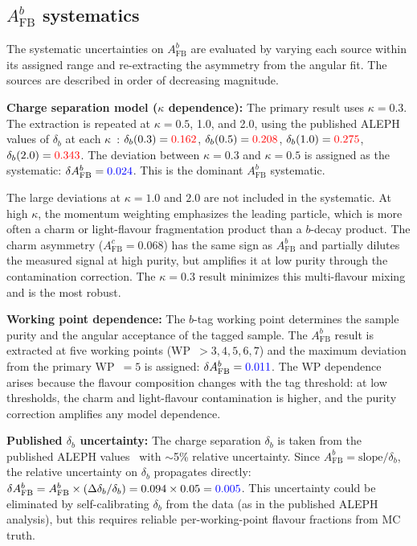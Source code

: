 \documentclass[11pt,a4paper]{article}
\newcommand{\measured}[1]{\textcolor{blue}{#1}}
\newcommand{\external}[1]{\textcolor{red}{#1}}
\begin{document}
\subsection{$A_\mathrm{FB}^b$ systematics}
\label{sec:syst-afb}

The systematic uncertainties on $A_\mathrm{FB}^b$ are evaluated by
varying each source within its assigned range and re-extracting the
asymmetry from the angular fit.  The sources are described in order
of decreasing magnitude.

\textbf{Charge separation model ($\kappa$ dependence):}
The primary result uses $\kappa = 0.3$.  The extraction is repeated
at $\kappa = 0.5$, 1.0, and 2.0, using the published ALEPH values of
$\delta_b$ at each $\kappa$~\cite{ALEPH:AFBb}: $\delta_b(0.3) =
\external{0.162}$, $\delta_b(0.5) = \external{0.208}$,
$\delta_b(1.0) = \external{0.275}$, $\delta_b(2.0) = \external{0.343}$.
The deviation between $\kappa = 0.3$ and $\kappa = 0.5$ is assigned as
the systematic: $\delta A_\mathrm{FB}^b = \measured{0.024}$.  This is
the dominant $A_\mathrm{FB}^b$ systematic.

The large deviations at $\kappa = 1.0$ and $2.0$ are not included in the
systematic.  At high $\kappa$, the momentum weighting emphasizes the
leading particle, which is more often a charm or light-flavour fragmentation
product than a $b$-decay product.  The charm asymmetry
($A_\mathrm{FB}^c = 0.068$) has the same sign as $A_\mathrm{FB}^b$
and partially dilutes the measured signal at high purity, but amplifies
it at low purity through the contamination correction.  The $\kappa = 0.3$
result minimizes this multi-flavour mixing and is the most robust.

\textbf{Working point dependence:}
The $b$-tag working point determines the sample purity and the angular
acceptance of the tagged sample.  The $A_\mathrm{FB}^b$ result is
extracted at five working points (WP~$> 3, 4, 5, 6, 7$) and the maximum
deviation from the primary WP~$= 5$ is assigned:
$\delta A_\mathrm{FB}^b = \measured{0.011}$.  The WP dependence arises
because the flavour composition changes with the tag threshold: at low
thresholds, the charm and light-flavour contamination is higher, and
the purity correction amplifies any model dependence.

\textbf{Published $\delta_b$ uncertainty:}
The charge separation $\delta_b$ is taken from the published ALEPH
values~\cite{LEP:EWWG:2005} with $\sim$5\% relative uncertainty.  Since
$A_\mathrm{FB}^b = \mathrm{slope}/\delta_b$, the relative uncertainty
on $\delta_b$ propagates directly: $\delta A_\mathrm{FB}^b =
A_\mathrm{FB}^b \times (\Delta\delta_b / \delta_b) = 0.094 \times 0.05 =
\measured{0.005}$.  This uncertainty could be eliminated by self-calibrating
$\delta_b$ from the data (as in the published ALEPH analysis), but this
requires reliable per-working-point flavour fractions from MC truth.
\end{document}
